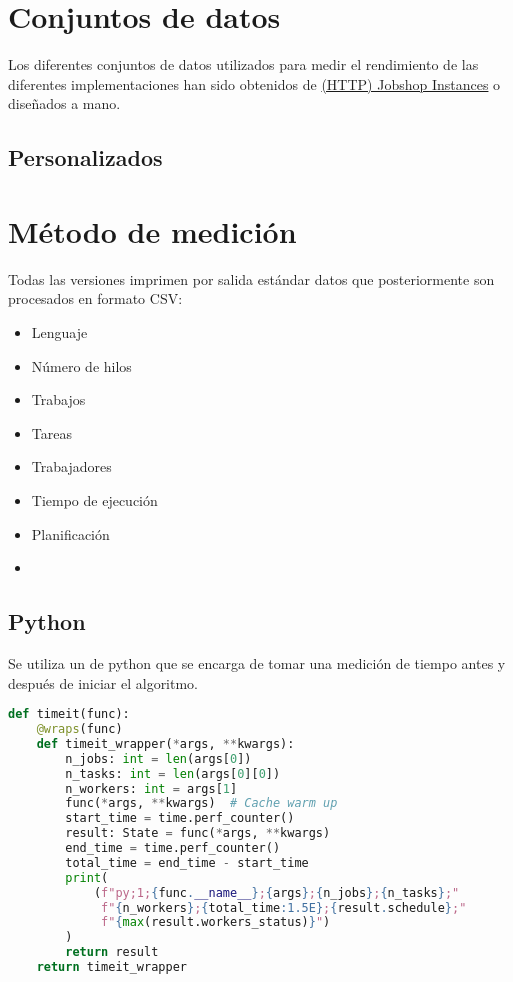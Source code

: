 
\section{Conjuntos de datos}

Los diferentes conjuntos de datos utilizados para medir el rendimiento
de las diferentes implementaciones han sido obtenidos de
\href{http://jobshop.jjvh.nl/}{(HTTP) Jobshop Instances}
o diseñados a mano.

\subsection{}

\subsection{Personalizados}

\section{Método de medición}

Todas las versiones imprimen por salida estándar datos que posteriormente son
procesados en formato CSV:

\begin{itemize}[itemsep=0.25px]
    \item Lenguaje
    \item Número de hilos
    \item Trabajos
    \item Tareas
    \item Trabajadores
    \item Tiempo de ejecución
    \item Planificación
    \item {}
\end{itemize}

\subsection{Python}

Se utiliza un  de python que se encarga de tomar
una medición de tiempo antes y después de iniciar el algoritmo.

\begin{lstlisting}[language=Python]
def timeit(func):
    @wraps(func)
    def timeit_wrapper(*args, **kwargs):
        n_jobs: int = len(args[0])
        n_tasks: int = len(args[0][0])
        n_workers: int = args[1]
        func(*args, **kwargs)  # Cache warm up
        start_time = time.perf_counter()
        result: State = func(*args, **kwargs)
        end_time = time.perf_counter()
        total_time = end_time - start_time
        print(
            (f"py;1;{func.__name__};{args};{n_jobs};{n_tasks};"
             f"{n_workers};{total_time:1.5E};{result.schedule};"
             f"{max(result.workers_status)}")
        )
        return result
    return timeit_wrapper
\end{lstlisting}

